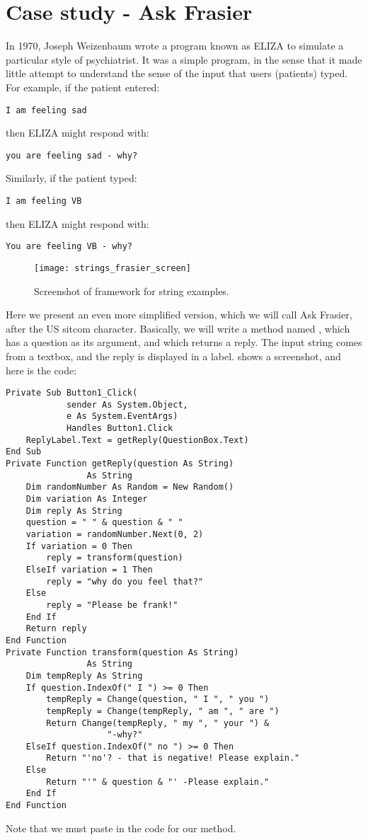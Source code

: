 	\section{Case study - Ask Frasier}
		In 1970, Joseph Weizenbaum wrote a program known as ELIZA to simulate a particular style of psychiatrist. It was a simple program, in the sense that it made little attempt to understand the sense of the input that users (patients) typed. For example, if the patient entered:
		\begin{lstlisting}
I am feeling sad
		\end{lstlisting}
		then ELIZA might respond with:
		\begin{lstlisting}
you are feeling sad - why?
		\end{lstlisting}
		Similarly, if the patient typed:
		\begin{lstlisting}
I am feeling VB
		\end{lstlisting}
		then ELIZA might respond with:
		\begin{lstlisting}
You are feeling VB - why?
		\end{lstlisting}
		\begin{figure}[bth]
			\centering
			\texttt{[image: strings\_frasier\_screen]}
			\caption{Screenshot of framework for string examples.}
			\label{fig:strings_frasier_screen}
		\end{figure}
		Here we present an even more simplified version, which we will call Ask Frasier, after the US sitcom character. Basically, we will write a method named , which has a question as its argument, and which returns a reply. The input string comes from a textbox, and the reply is displayed in a label.  shows a screenshot, and here is the code:
		\begin{lstlisting}
Private Sub Button1_Click(
			sender As System.Object,
			e As System.EventArgs)
			Handles Button1.Click
	ReplyLabel.Text = getReply(QuestionBox.Text)
End Sub
Private Function getReply(question As String)
				As String
	Dim randomNumber As Random = New Random()
	Dim variation As Integer
	Dim reply As String
	question = " " & question & " "
	variation = randomNumber.Next(0, 2)
	If variation = 0 Then
		reply = transform(question)
	ElseIf variation = 1 Then
		reply = "why do you feel that?"
	Else
		reply = "Please be frank!"
	End If
	Return reply
End Function
Private Function transform(question As String)
				As String
	Dim tempReply As String		
	If question.IndexOf(" I ") >= 0 Then
		tempReply = Change(question, " I ", " you ")
		tempReply = Change(tempReply, " am ", " are ")
		Return Change(tempReply, " my ", " your ") &
					"-why?"
	ElseIf question.IndexOf(" no ") >= 0 Then
		Return "'no'? - that is negative! Please explain."
	Else
		Return "'" & question & "' -Please explain."
	End If
End Function
		\end{lstlisting}
		Note that we must paste in the code for our  method.
		
